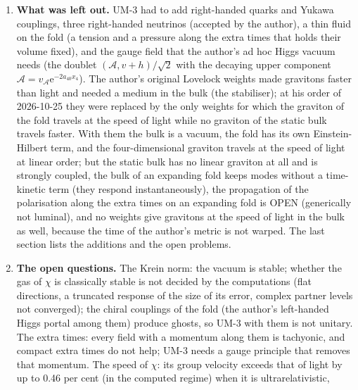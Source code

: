 \documentclass[
  10pt,
]{article}
\begin{document}
\begin{enumerate}
  whose pressure is minus its energy density (\(w = -1\), \(w\) the
  ratio of pressure to energy density); it fits the cosmic microwave
  background (CMB) but keeps the tension of the cosmological-constant
  model with the baryon acoustic oscillations (BAO) of DESI DR2, 2.3
  standard deviations in DESI's own analysis (DERIVED: \(w = -1\);
  STANDARD: the tension).
\item
  \textbf{What was left out.} UM-3 had to add right-handed quarks and
  Yukawa couplings, three right-handed neutrinos (accepted by the
  author), a thin fluid on the fold (a tension and a pressure along the
  extra times that holds their volume fixed), and the gauge field that
  the author's ad hoc Higgs vacuum needs (the doublet
  \((\mathcal{A}, v + h)/\sqrt2\) with the decaying upper component
  \(\mathcal{A} = v_{\mathcal{A}}\mathrm{e}^{-2a_{40}x_4}\)). The
  author's original Lovelock weights made gravitons faster than light
  and needed a medium in the bulk (the stabiliser); at his order of
  2026-10-25 they were replaced by the only weights for which the
  graviton of the fold travels at the speed of light while no graviton
  of the static bulk travels faster. With them the bulk is a vacuum, the
  fold has its own Einstein-Hilbert term, and the four-dimensional
  graviton travels at the speed of light at linear order; but the static
  bulk has no linear graviton at all and is strongly coupled, the bulk
  of an expanding fold keeps modes without a time-kinetic term (they
  respond instantaneously), the propagation of the polarisation along
  the extra times on an expanding fold is OPEN (generically not
  luminal), and no weights give gravitons at the speed of light in the
  bulk as well, because the time of the author's metric is not warped.
  The last section lists the additions and the open problems.
\item
  \textbf{The open questions.} The Krein norm: the vacuum is stable;
  whether the gas of \(\chi\) is classically stable is not decided by
  the computations (flat directions, a truncated response of the size of
  its error, complex partner levels not converged); the chiral couplings
  of the fold (the author's left-handed Higgs portal among them) produce
  ghosts, so UM-3 with them is not unitary. The extra times: every field
  with a momentum along them is tachyonic, and compact extra times do
  not help; UM-3 needs a gauge principle that removes that momentum. The
  speed of \(\chi\): its group velocity exceeds that of light by up to
  0.46 per cent (in the computed regime) when it is ultrarelativistic,

\end{enumerate}
\end{document}

